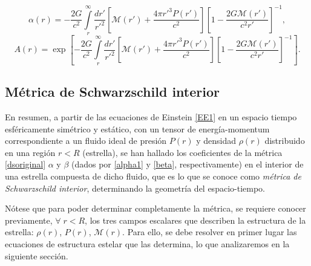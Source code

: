 \begin{equation}\label{alpha1}
\boxed{\alpha(r)=-\frac{2G}{c^2}\int\limits_r^{\infty}\frac{dr'}{r'^2}\left[ \mathcal{M}(r')+\frac{4\pi r'^3P(r')}{c^2}\right]\left[ 1-\frac{2G\mathcal{M}(r')}{c^2r'}\right]^{-1},}
\end{equation}
\begin{equation}\label{alpha2}
\boxed{A(r)=\exp{\left[-\frac{2G}{c^2}\int\limits_r^{\infty}\frac{dr'}{r'^2}\left[ \mathcal{M}(r')+\frac{4\pi r'^3P(r')}{c^2}\right]\left[ 1-\frac{2G\mathcal{M}(r')}{c^2r'}\right]^{-1}\right]}.}
\end{equation}

\subsection{Métrica de Schwarzschild interior}

En resumen, a partir de las ecuaciones de Einstein \eqref{EE1} en un espacio tiempo esféricamente simétrico y estático, con un tensor de energía-momentum correspondiente a un fluido ideal de presión $P(r)$ y densidad $\rho(r)$ distribuido en una región $r<R$ (estrella), se han hallado los coeficientes de la métrica \eqref{dsoriginal} $\alpha$  y $\beta$ (dados por \eqref{alpha1} y \eqref{beta}, respectivamente) en el interior de una estrella compuesta de dicho fluido, que es lo que se conoce como \emph{métrica de Schwarzschild interior}, determinando la geometría del espacio-tiempo.

Nótese que para poder determinar completamente la métrica, se requiere conocer previamente, $\forall \;r<R$, los tres campos escalares que describen la estructura de la estrella: $\rho(r)$, $P(r)$, $\mathcal{M}(r)$. Para ello, se debe resolver en primer lugar las ecuaciones de estructura estelar que las determina, lo que analizaremos en la siguiente sección.

